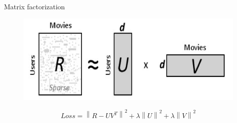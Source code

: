 \documentclass{beamer}
\newcommand{\lnorm}[1]{\left\lVert#1\right\rVert^2}
\begin{document}
\begin{frame}{Matrix factorization}

\begin{figure}[h]
\includegraphics[scale=0.60]{img/matrix_factorization}
\end{figure}


$$
Loss = \lnorm{R - UV^T} + \lambda \lnorm{U} + \lambda \lnorm{V} 
$$

\end{frame}
\end{document}
